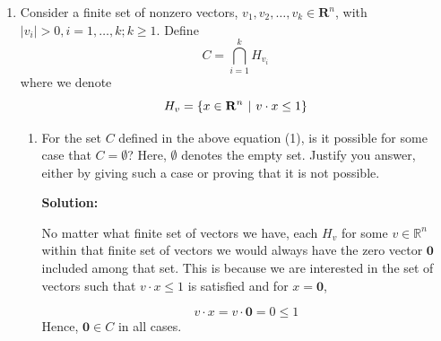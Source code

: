 \documentclass[12pt]{article}
\newenvironment{solution}
  {\par\noindent\textbf{Solution:}\par}
  {\par}
\begin{document}
\begin{enumerate}
\item Consider a finite set of nonzero vectors, $v_1,v_2,\dots,v_k \in \mathbf{R}^n$, with $\left|v_i\right| > 0, i = 1, \dots, k;
  k \ge 1$. Define $$ C = \bigcap_{i=1}^k H_{v_i}$$ where we denote $$H_v = \{ x \in \mathbf{R}^n \hspace{.05in}\vert \hspace{.05in} v \cdot x \le 1 \}$$
 \begin{enumerate}[label=\alph*.] %
   \item For the set $C$ defined in the above equation (1), is it possible for some case that $C=\emptyset$? Here, $\emptyset$ denotes the empty set. Justify you answer, either by giving such a case or proving that it is not possible.
   \begin{solution}
     No matter what finite set of vectors we have, each $H_v$ for some $v \in \mathbb{R}^n$ within that finite set of vectors 
     we would always have the zero vector $\textbf{0}$ included among that set. This is because we are interested 
     in the set of vectors such that $ v \cdot x \le 1$ is satisfied and for $ x = \textbf{0}$,

     $$v \cdot x = v \cdot \textbf{0} = 0 \le 1$$
     Hence, $\textbf{0} \in C$ in all cases.
  \end{solution}


\end{enumerate}
\end{enumerate}
\end{document}
